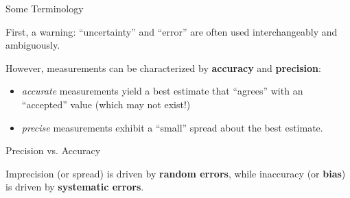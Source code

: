 \documentclass[aspectratio=1610]{beamer}
\begin{document}
\begin{frame}{Some Terminology}

First, a \textcolor{wcalerted}{warning}: ``uncertainty'' and ``error'' are often used interchangeably and ambiguously.

\pause
\vfill

However, measurements can be characterized by {\bf accuracy} and {\bf precision}:

\pause
\begin{itemize}
 \item {\it accurate} measurements yield a best estimate that ``agrees'' with an ``accepted'' value (which may not exist!)
 \pause
 \item {\it precise} measurements exhibit a ``small'' spread about the best estimate.
\end{itemize}



\end{frame}


\begin{frame}{Precision vs. Accuracy}

\begin{figure}[h!]
    \centering
    \resizebox{\textwidth}{!}{}
\end{figure}

\vfill

\pause

Imprecision (or spread) is driven by {\bf random errors}, while inaccuracy (or {\bf bias}) is driven by {\bf systematic errors}.

\end{frame}
\end{document}
